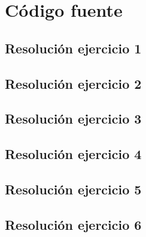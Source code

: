 \documentclass[11pt,a4paper]{article}
\begin{document}
\newpage
\appendix
\section{Código fuente}\label{appendix_codigo_fuente}

	\subsection{Resolución ejercicio 1}\label{ejercicio_1}
		

	\newpage

	\subsection{Resolución ejercicio 2}\label{ejercicio_2}
		

	\newpage

	\subsection{Resolución ejercicio 3}\label{ejercicio_3}
		

	\newpage

	\subsection{Resolución ejercicio 4}\label{ejercicio_4}
		

	\newpage

	\subsection{Resolución ejercicio 5}\label{ejercicio_5}
		

	\newpage

	\subsection{Resolución ejercicio 6}\label{ejercicio_6}
		

	\newpage
\end{document}
